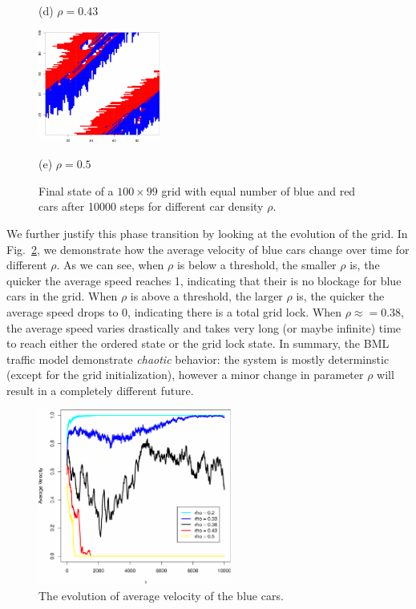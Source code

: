\documentclass[twocolumn]{article}
\begin{document}
\begin{figure}[!t]
\begin{minipage}[b]{0.49\linewidth}
      \centerline{(d) $\rho = 0.43$}\medskip
    \end{minipage}
    \hfill
    \begin{minipage}[b]{1\linewidth}
      \centering
      \centerline{\includegraphics[width=4.0cm]{./figs/TestBehavior_100_99_10000_05_end}}
      \centerline{(e) $\rho = 0.5$}\medskip
    \end{minipage}
    \caption{Final state of a $100\times99$ grid with equal number of blue and
    red cars after 10000 steps for different car density $\rho$.}
    \label{fig:final_state}
\end{figure}

We further justify this phase transition by looking at the evolution of the
grid. In Fig.~\ref{fig:average_velocity}, we demonstrate how the average
velocity of blue cars change over time for different $\rho$. As we can see, when
$\rho$ is below a threshold, the smaller $\rho$ is, the quicker the average
speed reaches 1, indicating that their is no blockage for blue cars in the grid.
When $\rho$ is above a threshold, the larger $\rho$ is, the quicker the average
speed drops to 0, indicating there is a total grid lock. When $\rho\approx=
0.38$, the average speed varies drastically and takes very long (or maybe
infinite) time to reach either the ordered state or the grid lock state. In
summary, the BML traffic model demonstrate \emph{chaotic} behavior: the system
is mostly determinstic (except for the grid initialization), however a minor
change in parameter $\rho$ will result in a completely different future.

\begin{figure}[h]
    \centering
    \includegraphics[width=2.5in]{figs/TestVelocity.pdf}
    \caption{The evolution of average velocity of the blue cars.}
    \label{fig:average_velocity}
\end{figure}
\end{document}
